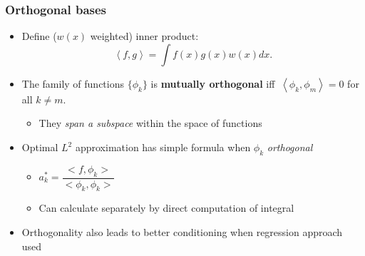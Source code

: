 \documentclass[bigger]{beamer}
\begin{document}
\begin{frame}%

\frametitle{Orthogonal bases}

\begin{itemize}

\item  Define ($w(x)$ weighted) inner product:%
\begin{equation*}
\left\langle f,g\right\rangle =\int f(x)g(x)w(x)dx.
\end{equation*}

\item The family of functions $\{\phi _{k}\}$ is \textbf{mutually
orthogonal} \newline
iff $\ \left\langle \phi _{k},\phi _{m}\right\rangle =0$ for all $k\neq m$.

\begin{itemize}
\item They \emph{span a subspace} within the space of functions
\end{itemize}

\item Optimal $L^2$ approximation has simple formula when $\phi_k$ \emph{orthogonal} 
\begin{itemize}
\item $a_{k}^{\ast }=\dfrac{<f,\phi _{k}>}{<\phi _{k},\phi _{k}>}$
\item Can calculate separately by direct computation of integral
\end{itemize}

\item Orthogonality also leads to better conditioning when regression approach used


\end{itemize}


\end{frame}%
\end{document}
